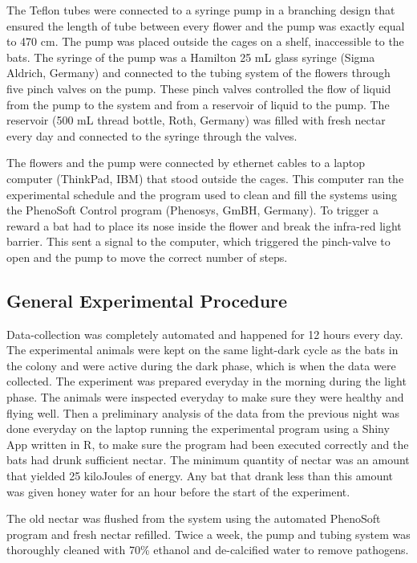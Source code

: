 \documentclass[
]{article}
\begin{document}
The Teflon tubes were connected to a syringe pump in a branching design that ensured the length of tube between every flower and the pump was exactly equal to 470 cm. The pump was placed outside the cages on a shelf, inaccessible to the bats. The syringe of the pump was a Hamilton 25 mL glass syringe (Sigma Aldrich, Germany) and connected to the tubing system of the flowers through five pinch valves on the pump. These pinch valves controlled the flow of liquid from the pump to the system and from a reservoir of liquid to the pump. The reservoir (500 mL thread bottle, Roth, Germany) was filled with fresh nectar every day and connected to the syringe through the valves.

The flowers and the pump were connected by ethernet cables to a laptop computer (ThinkPad, IBM) that stood outside the cages. This computer ran the experimental schedule and the program used to clean and fill the systems using the PhenoSoft Control program (Phenosys, GmBH, Germany). To trigger a reward a bat had to place its nose inside the flower and break the infra-red light barrier. This sent a signal to the computer, which triggered the pinch-valve to open and the pump to move the correct number of steps.

\hypertarget{general-experimental-procedure}{%
\subsection{General Experimental Procedure}\label{general-experimental-procedure}}

Data-collection was completely automated and happened for 12 hours every day. The experimental animals were kept on the same light-dark cycle as the bats in the colony and were active during the dark phase, which is when the data were collected. The experiment was prepared everyday in the morning during the light phase. The animals were inspected everyday to make sure they were healthy and flying well. Then a preliminary analysis of the data from the previous night was done everyday on the laptop running the experimental program using a Shiny App written in R, to make sure the program had been executed correctly and the bats had drunk sufficient nectar. The minimum quantity of nectar was an amount that yielded 25 kiloJoules of energy. Any bat that drank less than this amount was given honey water for an hour before the start of the experiment.

The old nectar was flushed from the system using the automated PhenoSoft program and fresh nectar refilled. Twice a week, the pump and tubing system was thoroughly cleaned with 70\% ethanol and de-calcified water to remove pathogens.
\end{document}

